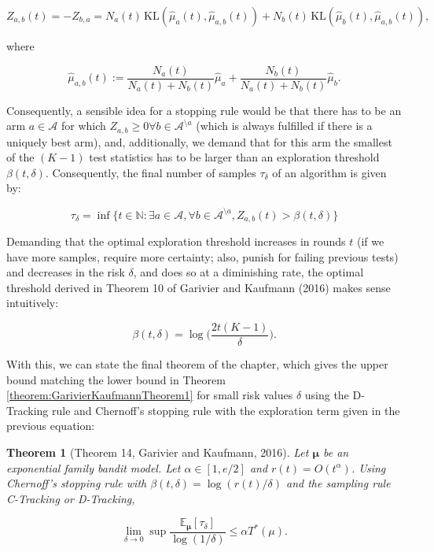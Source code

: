 \documentclass[12pt,]{article}
\newtheorem{theorem}{Theorem}
\newcommand{\KL}{\,\text{KL}}
\begin{document}
\begin{equation*}
Z_{a,b}(t) = - Z_{b,a} = N_a(t) \KL(\hat{\mu}_a(t),\hat{\mu}_{a,b}(t)) + N_b(t) \KL(\hat{\mu}_{b}(t), \hat{\mu}_{a,b}(t)),
\end{equation*}

where

\begin{equation*}
\hat{\mu}_{a,b}(t) := \frac{N_a(t)}{N_a(t) + N_b(t)}\hat{\mu}_a + \frac{N_b(t)}{N_a(t) + N_b(t)}\hat{\mu}_b.
\end{equation*}

Consequently, a sensible idea for a stopping rule would be that there
has to be an arm \(a \in \mathcal{A}\) for which
\(Z_{a,b} \geq 0 \forall b \in \mathcal{A}^{\setminus a}\) (which is
always fulfilled if there is a uniquely best arm), and, additionally, we
demand that for this arm the smallest of the \((K-1)\) test statistics
has to be larger than an exploration threshold \(\beta(t, \delta)\).
Consequently, the final number of samples \(\tau_{\delta}\) of an
algorithm is given by:

\begin{equation*}
\tau_{\delta} = \inf \{t \in \mathbb{N}: \exists a \in \mathcal{A}, \forall b\in \mathcal{A}^{\setminus a}, Z_{a,b}(t) > \beta(t, \delta)\}
\end{equation*}

Demanding that the optimal exploration threshold increases in rounds
\(t\) (if we have more samples, require more certainty; also, punish for
failing previous tests) and decreases in the risk \(\delta\), and does
so at a diminishing rate, the optimal threshold derived in Theorem 10 of
Garivier and Kaufmann (2016) makes sense intuitively:

\begin{equation*}
\beta(t, \delta) = \log \Big(\frac{2t(K-1)}{\delta}\Big).
\end{equation*}

With this, we can state the final theorem of the chapter, which gives
the upper bound matching the lower bound in Theorem
\ref{theorem:GarivierKaufmannTheorem1} for small risk values \(\delta\)
using the D-Tracking rule and Chernoff's stopping rule with the
exploration term given in the previous equation:

\begin{theorem}[Theorem 14, Garivier and Kaufmann, 2016] \label{theorem:GarivierAndKaufmannTheorem14}
Let $\bm{\mu}$ be an exponential family bandit model. Let $\alpha \in [1, e/2]$ and $r(t) = O(t^{\alpha})$. Using Chernoff's stopping rule with $\beta(t,\delta) = \log(r(t)/\delta)$ and the sampling rule C-Tracking or D-Tracking,

\begin{equation*}
\lim_{\delta \to 0} \sup \frac{\mathbb{E}_{\bm{\mu}}[\tau_{\delta}]}{\log(1/\delta)} \leq \alpha T^*(\mu).
\end{equation*}
\end{theorem}
\end{document}
